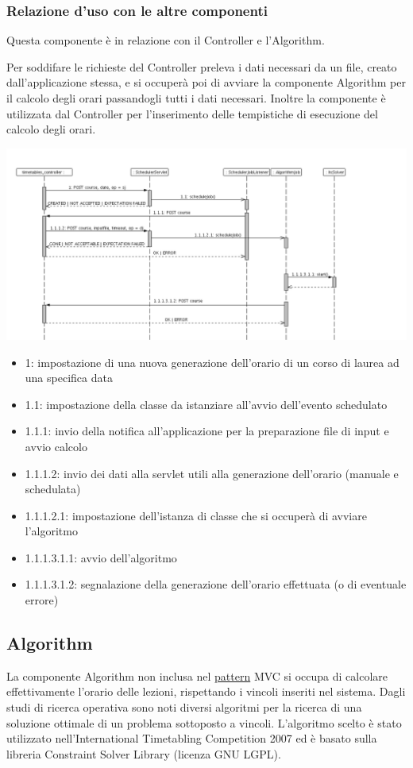 \documentclass[11pt,a4paper]{article}
\begin{document}
\subsubsection{Relazione d'uso con le altre componenti}
Questa componente è in relazione con il Controller e l'Algorithm. 

Per soddifare le richieste del Controller preleva i dati necessari da un file, creato dall'applicazione stessa, e si occuperà poi di avviare la componente Algorithm per il calcolo degli orari passandogli tutti i dati necessari.
Inoltre la componente è utilizzata dal Controller per l'inserimento delle tempistiche di esecuzione del calcolo degli orari.

\includegraphics[scale=0.3]{images/MiddleMan_sequence_diagram.png}
\begin{itemize}
\item 1: impostazione di una nuova generazione dell'orario di un corso di laurea ad una specifica data
\item 1.1: impostazione della classe da istanziare all'avvio dell'evento schedulato
\item 1.1.1: invio della notifica all'applicazione per la preparazione file di input e avvio calcolo
\item 1.1.1.2: invio dei dati alla servlet utili alla generazione dell'orario (manuale e schedulata)
\item 1.1.1.2.1: impostazione dell'istanza di classe che si occuperà di avviare l'algoritmo
\item 1.1.1.3.1.1: avvio dell'algoritmo
\item 1.1.1.3.1.2: segnalazione della generazione dell'orario effettuata (o di eventuale errore)	
\end{itemize}

\subsection{Algorithm}
La componente Algorithm non inclusa nel \underline{pattern} MVC si occupa di calcolare effettivamente l'orario delle lezioni, rispettando i vincoli inseriti nel sistema. Dagli studi di ricerca operativa sono noti diversi algoritmi per la ricerca di una soluzione ottimale di un problema sottoposto a vincoli. L'algoritmo scelto è stato utilizzato nell'International Timetabling Competition 2007 ed è basato sulla libreria Constraint Solver Library (licenza GNU LGPL).
\end{document}
